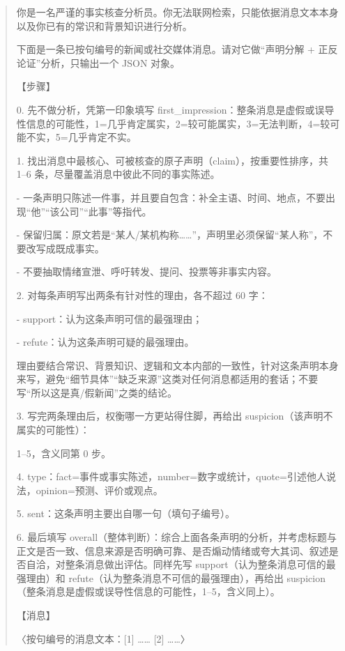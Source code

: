 {\small\setlength{\parindent}{0pt}\begin{quote}
你是一名严谨的事实核查分析员。你无法联网检索，只能依据消息文本本身以及你已有的常识和背景知识进行分析。\par
\vspace{3pt}
下面是一条已按句编号的新闻或社交媒体消息。请对它做“声明分解 + 正反论证”分析，只输出一个 JSON 对象。\par
\vspace{3pt}
【步骤】\par
0. 先不做分析，凭第一印象填写 first\_impression：整条消息是虚假或误导性信息的可能性，1=几乎肯定属实，2=较可能属实，3=无法判断，4=较可能不实，5=几乎肯定不实。\par
1. 找出消息中最核心、可被核查的原子声明（claim），按重要性排序，共 1–6 条，尽量覆盖消息中彼此不同的事实陈述。\par
\hspace*{3em}- 一条声明只陈述一件事，并且要自包含：补全主语、时间、地点，不要出现“他”“该公司”“此事”等指代。\par
\hspace*{3em}- 保留归属：原文若是“某人/某机构称……”，声明里必须保留“某人称”，不要改写成既成事实。\par
\hspace*{3em}- 不要抽取情绪宣泄、呼吁转发、提问、投票等非事实内容。\par
2. 对每条声明写出两条有针对性的理由，各不超过 60 字：\par
\hspace*{3em}- support：认为这条声明可信的最强理由；\par
\hspace*{3em}- refute：认为这条声明可疑的最强理由。\par
\hspace*{3em}理由要结合常识、背景知识、逻辑和文本内部的一致性，针对这条声明本身来写，避免“细节具体”“缺乏来源”这类对任何消息都适用的套话；不要写“所以这是真/假新闻”之类的结论。\par
3. 写完两条理由后，权衡哪一方更站得住脚，再给出 suspicion（该声明不属实的可能性）：\par
\hspace*{3em}1–5，含义同第 0 步。\par
4. type：fact=事件或事实陈述，number=数字或统计，quote=引述他人说法，opinion=预测、评价或观点。\par
5. sent：这条声明主要出自哪一句（填句子编号）。\par
6. 最后填写 overall（整体判断）：综合上面各条声明的分析，并考虑标题与正文是否一致、信息来源是否明确可靠、是否煽动情绪或夸大其词、叙述是否自洽，对整条消息做出评估。同样先写 support（认为整条消息可信的最强理由）和 refute（认为整条消息不可信的最强理由），再给出 suspicion（整条消息是虚假或误导性信息的可能性，1–5，含义同上）。\par
\vspace{3pt}
【消息】\par
〈按句编号的消息文本：[1] …… [2] ……〉\par
\end{quote}}

